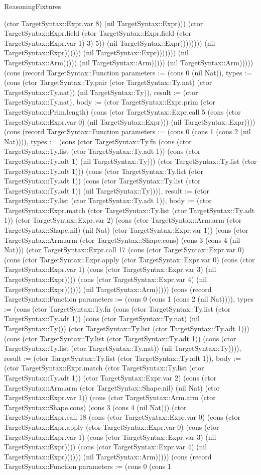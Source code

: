 \begin{lexlean}{ReasoningFixtures}
\begin{semanticmodule}
{(ctor TargetSyntax::Expr.var 8) (nil TargetSyntax::Expr))) (ctor TargetSyntax::Expr.field (ctor TargetSyntax::Expr.field (ctor TargetSyntax::Expr.var 1) 3) 5)) (nil TargetSyntax::Expr)))))))) (nil TargetSyntax::Expr)))))) (nil TargetSyntax::Expr))))))) (nil TargetSyntax::Arm))))) (nil TargetSyntax::Arm))))) (nil TargetSyntax::Arm))))}) (cons (record TargetSyntax::Function {parameters := (cons 0 (nil Nat)), types := (cons (ctor TargetSyntax::Ty.pair (ctor TargetSyntax::Ty.nat) (ctor TargetSyntax::Ty.nat)) (nil TargetSyntax::Ty)), result := (ctor TargetSyntax::Ty.nat), body := (ctor TargetSyntax::Expr.prim (ctor TargetSyntax::Prim.length) (cons (ctor TargetSyntax::Expr.call 5 (cons (ctor TargetSyntax::Expr.var 0) (nil TargetSyntax::Expr))) (nil TargetSyntax::Expr)))}) (cons (record TargetSyntax::Function {parameters := (cons 0 (cons 1 (cons 2 (nil Nat)))), types := (cons (ctor TargetSyntax::Ty.fn (cons (ctor TargetSyntax::Ty.list (ctor TargetSyntax::Ty.adt 1)) (cons (ctor TargetSyntax::Ty.adt 1) (nil TargetSyntax::Ty))) (ctor TargetSyntax::Ty.list (ctor TargetSyntax::Ty.adt 1))) (cons (ctor TargetSyntax::Ty.list (ctor TargetSyntax::Ty.adt 1)) (cons (ctor TargetSyntax::Ty.list (ctor TargetSyntax::Ty.adt 1)) (nil TargetSyntax::Ty)))), result := (ctor TargetSyntax::Ty.list (ctor TargetSyntax::Ty.adt 1)), body := (ctor TargetSyntax::Expr.match (ctor TargetSyntax::Ty.list (ctor TargetSyntax::Ty.adt 1)) (ctor TargetSyntax::Expr.var 2) (cons (ctor TargetSyntax::Arm.arm (ctor TargetSyntax::Shape.nil) (nil Nat) (ctor TargetSyntax::Expr.var 1)) (cons (ctor TargetSyntax::Arm.arm (ctor TargetSyntax::Shape.cons) (cons 3 (cons 4 (nil Nat))) (ctor TargetSyntax::Expr.call 17 (cons (ctor TargetSyntax::Expr.var 0) (cons (ctor TargetSyntax::Expr.apply (ctor TargetSyntax::Expr.var 0) (cons (ctor TargetSyntax::Expr.var 1) (cons (ctor TargetSyntax::Expr.var 3) (nil TargetSyntax::Expr)))) (cons (ctor TargetSyntax::Expr.var 4) (nil TargetSyntax::Expr)))))) (nil TargetSyntax::Arm))))}) (cons (record TargetSyntax::Function {parameters := (cons 0 (cons 1 (cons 2 (nil Nat)))), types := (cons (ctor TargetSyntax::Ty.fn (cons (ctor TargetSyntax::Ty.list (ctor TargetSyntax::Ty.adt 1)) (cons (ctor TargetSyntax::Ty.nat) (nil TargetSyntax::Ty))) (ctor TargetSyntax::Ty.list (ctor TargetSyntax::Ty.adt 1))) (cons (ctor TargetSyntax::Ty.list (ctor TargetSyntax::Ty.adt 1)) (cons (ctor TargetSyntax::Ty.list (ctor TargetSyntax::Ty.nat)) (nil TargetSyntax::Ty)))), result := (ctor TargetSyntax::Ty.list (ctor TargetSyntax::Ty.adt 1)), body := (ctor TargetSyntax::Expr.match (ctor TargetSyntax::Ty.list (ctor TargetSyntax::Ty.adt 1)) (ctor TargetSyntax::Expr.var 2) (cons (ctor TargetSyntax::Arm.arm (ctor TargetSyntax::Shape.nil) (nil Nat) (ctor TargetSyntax::Expr.var 1)) (cons (ctor TargetSyntax::Arm.arm (ctor TargetSyntax::Shape.cons) (cons 3 (cons 4 (nil Nat))) (ctor TargetSyntax::Expr.call 18 (cons (ctor TargetSyntax::Expr.var 0) (cons (ctor TargetSyntax::Expr.apply (ctor TargetSyntax::Expr.var 0) (cons (ctor TargetSyntax::Expr.var 1) (cons (ctor TargetSyntax::Expr.var 3) (nil TargetSyntax::Expr)))) (cons (ctor TargetSyntax::Expr.var 4) (nil TargetSyntax::Expr)))))) (nil TargetSyntax::Arm))))}) (cons (record TargetSyntax::Function {parameters := (cons 0 (cons 1 }
\end{semanticmodule}
\end{lexlean}
